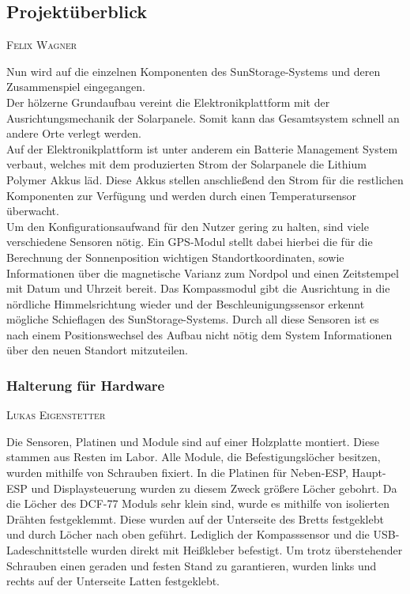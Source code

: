 \documentclass[12pt,a4paper,bibliography=totocnumbered,listof=totocnumbered]{article}
\makeatletter
\newcommand{\chapterauthor}[1]{%
  {\parindent0pt\vspace*{-5pt}%
  \linespread{1.1}\small\scshape#1%
  \par\nobreak\vspace*{3pt}}
  \@afterheading%
}
\makeatother
\begin{document}
\subsection{Projektüberblick}
\chapterauthor{Felix Wagner}
Nun wird auf die einzelnen Komponenten des SunStorage-Systems und deren Zusammenspiel eingegangen.\\
Der hölzerne Grundaufbau vereint die Elektronikplattform mit der Ausrichtungsmechanik der Solarpanele. 
Somit kann das Gesamtsystem schnell an andere Orte verlegt werden.\\
Auf der Elektronikplattform ist unter anderem ein Batterie Management System verbaut, welches mit dem produzierten Strom
der Solarpanele die Lithium Polymer Akkus läd. Diese Akkus stellen anschließend den Strom für die restlichen
Komponenten zur Verfügung und werden durch einen Temperatursensor überwacht.\\
Um den Konfigurationsaufwand für den Nutzer gering zu halten, sind viele verschiedene Sensoren nötig.
Ein GPS-Modul stellt dabei hierbei die für die Berechnung der Sonnenposition wichtigen Standortkoordinaten,
sowie Informationen über die magnetische Varianz zum Nordpol und einen Zeitstempel mit Datum und Uhrzeit bereit.
Das Kompassmodul gibt die Ausrichtung in die nördliche Himmelsrichtung wieder und der Beschleunigungssensor
erkennt mögliche Schieflagen des SunStorage-Systems. Durch all diese Sensoren ist es nach einem Positionswechsel
des Aufbau nicht nötig dem System Informationen über den neuen Standort mitzuteilen.\\





\subsubsection{Halterung für Hardware}
\chapterauthor{Lukas Eigenstetter}
Die Sensoren, Platinen und Module sind auf einer Holzplatte montiert.
Diese stammen aus Resten im Labor.
Alle Module, die Befestigungslöcher besitzen, wurden mithilfe von Schrauben fixiert.
In die Platinen für Neben-ESP, Haupt-ESP und Displaysteuerung wurden zu diesem  Zweck größere Löcher gebohrt.
Da die Löcher des DCF-77 Moduls sehr klein sind, wurde es mithilfe von isolierten Drähten festgeklemmt.
Diese wurden auf der Unterseite des Bretts festgeklebt und durch Löcher nach oben geführt.
Lediglich der Kompasssensor und die USB-Ladeschnittstelle wurden direkt mit Heißkleber befestigt.
Um trotz überstehender Schrauben einen geraden und festen Stand zu garantieren, wurden links und rechts auf der Unterseite Latten festgeklebt.
\end{document}
